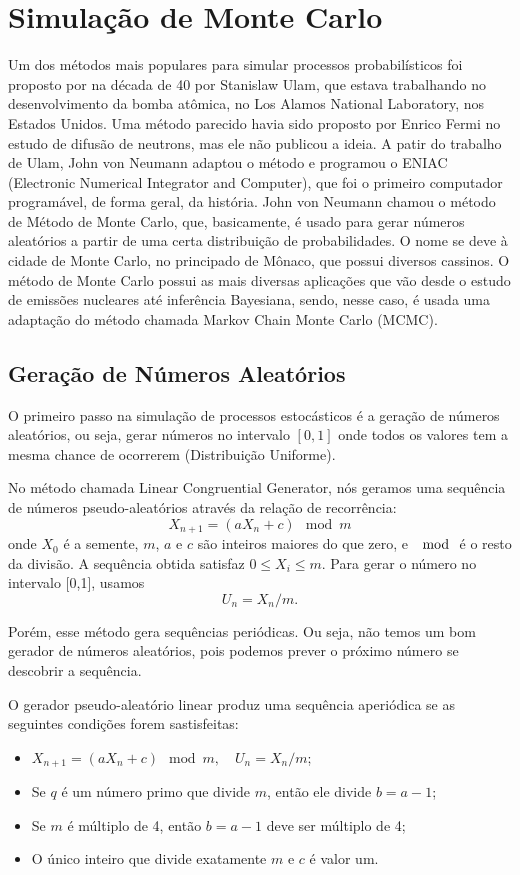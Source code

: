\documentclass{article}
\begin{document}
\section{Simulação de Monte Carlo}
Um dos métodos mais populares para simular processos probabilísticos foi proposto por na década de 40 por Stanislaw Ulam, que estava trabalhando no desenvolvimento da bomba atômica, no Los Alamos National Laboratory, nos Estados Unidos. Uma método parecido havia sido proposto por Enrico Fermi no estudo de difusão de neutrons, mas ele não publicou a ideia. A patir do trabalho de Ulam, John von Neumann adaptou o método e programou o  ENIAC (Electronic Numerical Integrator and Computer), que foi o primeiro computador programável, de forma geral, da história. John von Neumann chamou o método de Método de Monte Carlo, que, basicamente, é usado para gerar números aleatórios a partir de uma certa distribuição de probabilidades. O nome se deve à cidade de Monte Carlo, no principado de Mônaco, que possui diversos cassinos. O método de Monte Carlo possui as mais diversas aplicações que vão desde o estudo de emissões nucleares até inferência Bayesiana, sendo, nesse caso, é usada uma adaptação do método chamada Markov Chain Monte Carlo (MCMC).

\subsection{Geração de Números Aleatórios}
O primeiro passo na simulação de processos estocásticos é a geração de números aleatórios, ou seja, gerar números no intervalo $[0,1]$ onde todos os valores tem a mesma chance de ocorrerem (Distribuição Uniforme).

No método chamada Linear Congruential Generator, nós geramos uma sequência de números pseudo-aleatórios através da relação de recorrência:
    $$X_{n+1} = (aX_n + c) \mod m$$
onde $X_0$ é a semente, $m$, $a$ e $c$ são inteiros maiores do que zero, e $\mod$ é o resto da divisão. A sequência obtida satisfaz  $0 \leq X_i \leq m$. Para gerar o número no intervalo [0,1], usamos $$U_n = X_n/m.$$

Porém, esse método gera sequências periódicas. Ou seja, não temos um bom gerador de números aleatórios, pois podemos prever o próximo número se descobrir a sequência. 

O gerador pseudo-aleatório linear produz uma sequência aperiódica se as seguintes condições forem sastisfeitas:
    \begin{itemize}
        \item $X_{n+1} = (aX_n + c)\mod m, \quad U_n = X_n/m$;
        \item Se $q$ é um número primo que divide $m$, então ele divide $b=a-1$;
        \item Se $m$ é múltiplo de 4, então $b=a-1$ deve ser múltiplo de 4;
        \item O único inteiro que divide exatamente $m$ e $c$ é  valor um.
    \end{itemize}
\end{document}
